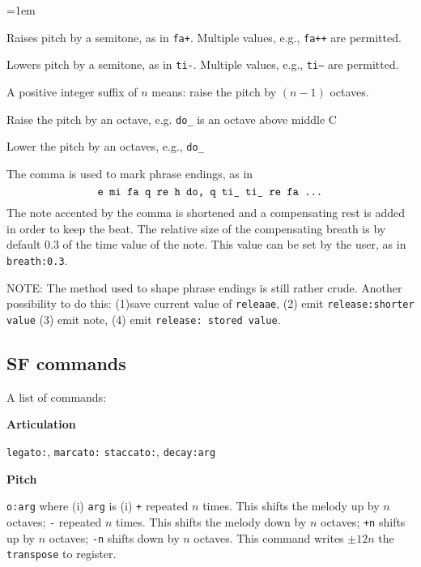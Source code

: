 \documentclass[11pt]{amsart}
\begin{document}
\begin{description}
\parskip=1em

\item[{\tt +}]  Raises pitch by a semitone, as in {\tt fa+}. Multiple
values, e.g., {\tt fa++} are permitted.

\item[{\tt -}]  Lowers pitch by a semitone, as in {\tt ti-}. Multiple
values, e.g., {\tt ti--} are permitted.

\item[{\tt <n>} ] A positive integer suffix of $n$ means: raise the pitch
by $(n-1)$ octaves.

\item[{\tt\^{}}]  Raise the pitch
by an octave, e.g. {\tt do\_} is an octave above middle C


\item[{\tt\_{}} ] Lower the pitch
by an octaves, e.g., {\tt do\_ }

\item[{\tt ,}]   The comma is used to mark phrase endings, as in 
\[
  \hbox{{\tt e mi fa q re h do, q ti\_ ti\_ re fa ...}}
\]
The note accented by the comma is shortened and a compensating rest is added
in order to keep the beat.  The relative size of the compensating breath
is by default 0.3 of the time value of the note.  This value can be set
by the user, as in {\tt breath:0.3}.  

\end{description}

NOTE:  The method used to shape phrase endings is still rather crude.  Another 
possibility to do this: (1)save current value of {\tt releaae}, 
(2) emit {\tt release:shorter value} (3) emit note, (4) emit {\tt release: stored value}.



\subsection{SF commands}

A list of commands:

{\bf Articulation}

{\tt legato:}, {\tt marcato:} {\tt staccato:}, {\tt decay:arg}


{\bf Pitch}

{\tt o:arg} where (i) {\tt arg} is (i) {\tt +} repeated $n$ times.  This shifts
the melody up by $n$ octaves; {\tt -} repeated $n$ times.  This shifts
the melody down by $n$ octaves; {\tt +n} shifts up by $n$ octaves;
{\tt -n} shifts down by $n$ octaves.  This command writes $\pm 12n$ the
{\tt transpose} to register.
\end{document}
